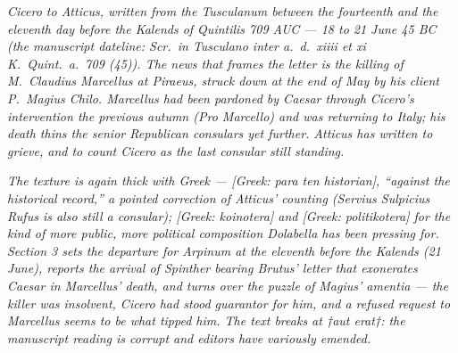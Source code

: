 
\textit{Cicero to Atticus, written from the Tusculanum
between the fourteenth and the eleventh day before the
Kalends of Quintilis 709 AUC --- 18 to 21 June 45 BC
(the manuscript dateline: \textit{Scr.\ in Tusculano
inter a.\ d.\ xiiii et xi K.\ Quint.\ a.\ 709 (45)}).
The news that frames the letter is the killing of
M.~Claudius Marcellus at Piraeus, struck down at the
end of May by his client P.~Magius Chilo. Marcellus
had been pardoned by Caesar through Cicero's
intervention the previous autumn (\textit{Pro Marcello})
and was returning to Italy; his death thins the senior
Republican consulars yet further. Atticus has written
to grieve, and to count Cicero as the last consular
still standing.}

\textit{The texture is again thick with Greek ---
\textit{[Greek: para ten historian]}, ``against the
historical record,'' a pointed correction of Atticus'
counting (Servius Sulpicius Rufus is also still a
consular); \textit{[Greek: koinotera]} and
\textit{[Greek: politikotera]} for the kind of more
public, more political composition Dolabella has been
pressing for. Section 3 sets the departure for Arpinum
at the eleventh before the Kalends (21 June), reports
the arrival of Spinther bearing Brutus' letter that
exonerates Caesar in Marcellus' death, and turns over
the puzzle of Magius' \textit{amentia} --- the killer
was insolvent, Cicero had stood guarantor for him, and
a refused request to Marcellus seems to be what tipped
him. The text breaks at \textit{†aut erat†}: the
manuscript reading is corrupt and editors have variously
emended.}
